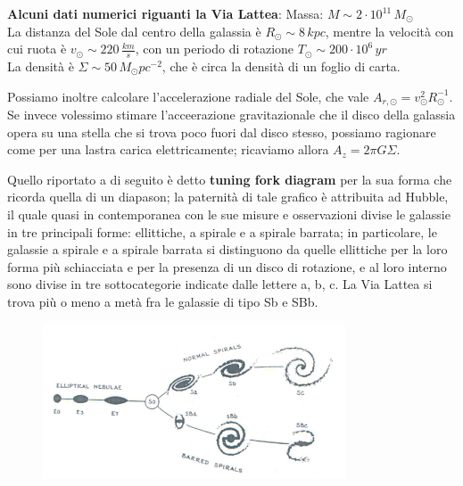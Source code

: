 \begin{minipage}{.65\textwidth}
\textbf{Alcuni dati numerici riguanti la Via Lattea}:
Massa: $M \sim 2 \cdot 10^{11} \, M_{\odot}$\\
La distanza del Sole dal centro della galassia è $R_{\odot} \sim 8 \, kpc$, mentre la velocità con cui ruota è $v_{\odot} \sim 220 \, \frac{km}{s}$, con un periodo di rotazione $T_{\odot} \sim 200 \cdot 10^6 \, yr$\\
La densità è $\Sigma \sim 50 \, M_{\odot}pc^{-2}$, che è circa la densità di un foglio di carta.\\
\end{minipage}

\vspace{0.2cm}

Possiamo inoltre calcolare l'accelerazione radiale del Sole, che vale $A_{r, \odot}= v_{\odot}^2 R_{\odot}^{-1}$. Se invece volessimo stimare l'acceerazione gravitazionale che il disco della galassia opera su una stella che si trova poco fuori dal disco stesso, possiamo ragionare come per una lastra carica elettricamente; ricaviamo allora $A_z = 2 \pi G \Sigma$.

Quello riportato a di seguito è detto \textbf{tuning fork diagram} per la sua forma che ricorda quella di un diapason; la paternità di tale grafico è attribuita ad Hubble, il quale quasi in contemporanea con le sue misure e osservazioni divise le galassie in tre principali forme: ellittiche, a spirale e a spirale barrata; in particolare, le galassie a spirale e a spirale barrata si distinguono da quelle ellittiche per la loro forma più schiacciata e per la presenza di un disco di rotazione, e al loro interno sono divise in tre sottocategorie indicate dalle lettere a, b, c. La Via Lattea si trova più o meno a metà fra le galassie di tipo Sb e SBb.

\begin{figure}[!h]
\centering
\includegraphics[width=0.8\textwidth]{Img/bertin_21.png}
\end{figure}

